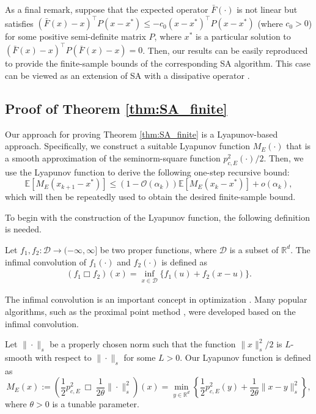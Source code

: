 \documentclass[11 pt]{article}
\begin{document}
	As a final remark, suppose that the expected operator $\bar{F}(\cdot)$ is not linear but satisfies $(\bar{F}(x)-x)^\top P(x-x^*)\leq -c_0(x-x^*)^\top P(x-x^*)$ (where $c_0>0$) for some positive semi-definite matrix $P$, where $x^*$ is a particular solution to $(\bar{F}(x)-x)^\top P(\bar{F}(x)-x)=0$. Then, our results can be easily reproduced to provide the finite-sample bounds of the corresponding SA algorithm. This case can be viewed as an extension of SA with a dissipative operator \cite{chen2019finite}.
	
	\subsection{Proof of Theorem \ref{thm:SA_finite}}\label{subsec:proofsketch}
	Our approach for proving Theorem \ref{thm:SA_finite} is a Lyapunov-based approach. Specifically, we construct a suitable Lyapunov function $M_E(\cdot)$ that is a smooth approximation of the seminorm-square function $p^2_{c,E}(\cdot)/2$. Then, we use the Lyapunov function to derive the following one-step recursive bound:
	\begin{equation}\label{eq:recursive contractive bound}
		\mathbb{E}\left[M_E(x_{k+1} - x^*)\right] \leq \left(1 - \mathcal{O}(\alpha_k)\right) \mathbb{E}\left[M_E(x_{k} - x^*)\right] + o(\alpha_k),
	\end{equation}
	which will then be repeatedly used to obtain the desired finite-sample bound.
	
	To begin with the construction of the Lyapunov function, the following definition is needed. 
	
	\begin{definition}\label{def:infimal_convolution}
		Let $f_1,f_2:\mathcal{D}\to (-\infty,\infty]$ be two proper functions, where $\mathcal{D}$ is a subset of $\mathbb{R}^d$. The infimal convolution of $f_1(\cdot)$ and $f_2(\cdot)$ is defined as
		\begin{align*}
			(f_1\Box f_2)(x)=\inf_{x\in\mathcal{D}}\{f_1(u)+f_2(x-u)\}.
		\end{align*}
	\end{definition}
	
	The infimal convolution is an important concept in optimization \cite{beck2017first}. Many popular algorithms, such as the proximal point method \cite{parikh2014proximal}, were developed based on the infimal convolution.
	
	Let $\|\cdot\|_s$ be a properly chosen norm such that the function $\|x\|_s^2/2$ is $L$-smooth with respect to $\|\cdot\|_s$ for some $L>0$. Our Lyapunov function is defined as
	$$M_E(x):=\left(\frac{1}{2}p^2_{c,E} ~\Box~ \frac{1}{2\theta} \| \cdot \|^2_s \right)(x) = \min_{y \in \mathbb{R}^d} \left\{\frac{1}{2} p^2_{c,E}(y) + \frac{1}{2\theta} \| x - y \|^2_s \right\},$$
	where $\theta > 0$ is a tunable parameter. 
	
\end{document}

